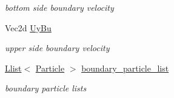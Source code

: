 \begin{CompactItemize}
\begin{CompactList}\small\item\em bottom side boundary velocity \item\end{CompactList}\item 
\hypertarget{classBoundary_47eeae29ae83c1ec9ed3a0fdd96bec23}{
Vec2d \hyperlink{classBoundary_47eeae29ae83c1ec9ed3a0fdd96bec23}{UyBu}}
\label{classBoundary_47eeae29ae83c1ec9ed3a0fdd96bec23}

\begin{CompactList}\small\item\em upper side boundary velocity \item\end{CompactList}\item 
\hypertarget{classBoundary_03c656384691f3575170447ab267b8a5}{
\hyperlink{classLlist}{Llist}$<$ \hyperlink{classParticle}{Particle} $>$ \hyperlink{classBoundary_03c656384691f3575170447ab267b8a5}{boundary\_\-particle\_\-list}}
\label{classBoundary_03c656384691f3575170447ab267b8a5}

\begin{CompactList}\small\item\em boundary particle lists \item\end{CompactList}\end{CompactItemize}
